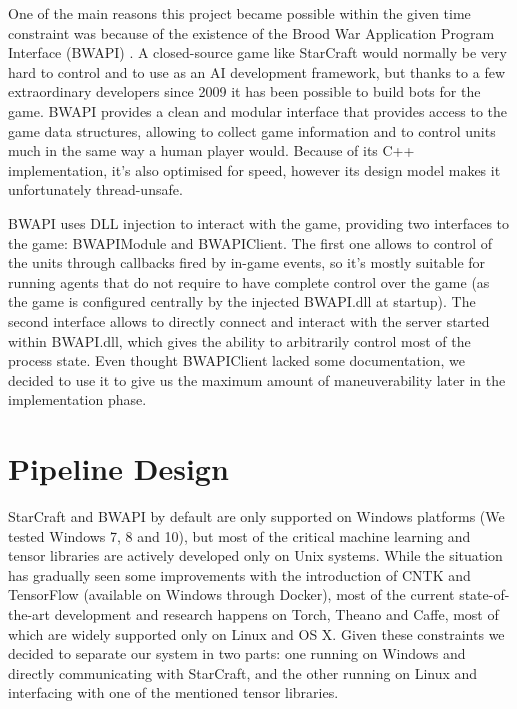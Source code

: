 One of the main reasons this project became possible within the given time
constraint was because of the existence of the Brood War Application Program
Interface (BWAPI) \citep{bwapi2011brood}. A closed-source game like StarCraft
would normally be very hard to control and to use as an AI development
framework, but thanks to a few extraordinary developers since 2009 it has been
possible to build bots for the game. BWAPI provides a clean and modular
interface that provides access to the game data structures, allowing to collect
game information and to control units much in the same way a human player would.
Because of its C++ implementation, it's also optimised for speed, however its
design model makes it unfortunately thread-unsafe.

BWAPI uses DLL injection to interact with the game, providing two interfaces to
the game: BWAPIModule and BWAPIClient. The first one allows to control of the
units through callbacks fired by in-game events, so it's mostly suitable for
running agents that do not require to have complete control over the game (as
the game is configured centrally by the injected BWAPI.dll at startup). The
second interface allows to directly connect and interact with the server started
within BWAPI.dll, which gives the ability to arbitrarily control most of the
process state. Even thought BWAPIClient lacked some documentation, we decided to
use it to give us the maximum amount of maneuverability later in the
implementation phase.

\section{Pipeline Design} %

StarCraft and BWAPI by default are only supported on Windows platforms (We
tested Windows 7, 8 and 10), but most of the critical machine learning and
tensor libraries are actively developed only on Unix systems. While the
situation has gradually seen some improvements with the introduction of CNTK
\citep{dallycntk} and TensorFlow \cite{abaditensorflow} (available on Windows
through Docker), most of the current state-of-the-art development and research
happens on Torch, Theano and Caffe, most of which are widely supported only on
Linux and OS X. Given these constraints we decided to separate our system in two
parts: one running on Windows and directly communicating with StarCraft, and the
other running on Linux and interfacing with one of the mentioned tensor
libraries.


